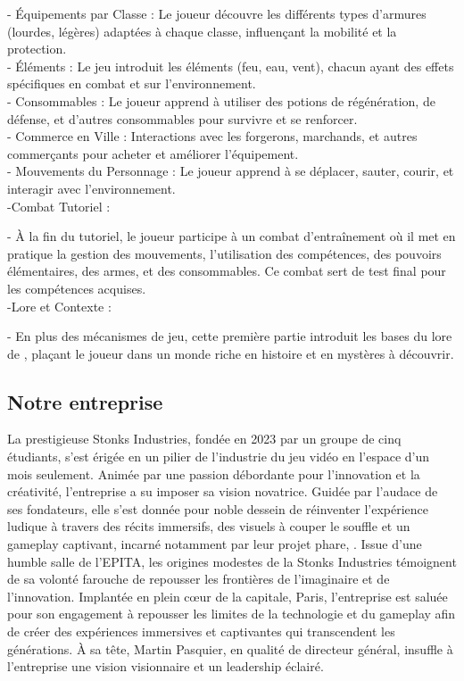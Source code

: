 - Équipements par Classe : Le joueur découvre les différents types d'armures (lourdes, légères) adaptées à chaque classe, influençant la mobilité et la protection.
\\

- Éléments : Le jeu introduit les éléments (feu, eau, vent), chacun ayant des effets spécifiques en combat et sur l'environnement.
\\

- Consommables : Le joueur apprend à utiliser des potions de régénération, de défense, et d'autres consommables pour survivre et se renforcer.
\\

- Commerce en Ville : Interactions avec les forgerons, marchands, et autres commerçants pour acheter et améliorer l'équipement.
\\

-  Mouvements du Personnage : Le joueur apprend à se déplacer, sauter, courir, et interagir avec l'environnement.
\\

-Combat Tutoriel :

- À la fin du tutoriel, le joueur participe à un combat d'entraînement où il met en pratique la gestion des mouvements, l'utilisation des compétences, des pouvoirs élémentaires, des armes, et des consommables.
Ce combat sert de test final pour les compétences acquises.
\\

-Lore et Contexte :

- En plus des mécanismes de jeu, cette première partie introduit les bases du lore de \gameName, plaçant le joueur dans un monde riche en histoire et en mystères à découvrir.



\subsection{Notre entreprise}

La prestigieuse Stonks Industries, fondée en 2023 par un groupe de cinq étudiants, s'est érigée en un pilier de l'industrie du jeu vidéo en l'espace d'un mois seulement. 
Animée par une passion débordante pour l'innovation et la créativité, l'entreprise a su imposer sa vision novatrice. Guidée par l'audace de ses fondateurs, elle s'est donnée 
pour noble dessein de réinventer l'expérience ludique à travers des récits immersifs, des visuels à couper le souffle et un gameplay captivant, incarné notamment par leur 
projet phare, \gameName. Issue d'une humble salle de l'EPITA, les origines modestes de la Stonks Industries témoignent de sa volonté farouche de repousser les frontières de 
l'imaginaire et de l'innovation.
Implantée en plein cœur de la capitale, Paris, l'entreprise est saluée pour son engagement à repousser les limites de la technologie et du gameplay afin de créer des 
expériences immersives et captivantes qui transcendent les générations. À sa tête, Martin Pasquier, en qualité de directeur général, insuffle à l'entreprise une vision 
visionnaire et un leadership éclairé.

